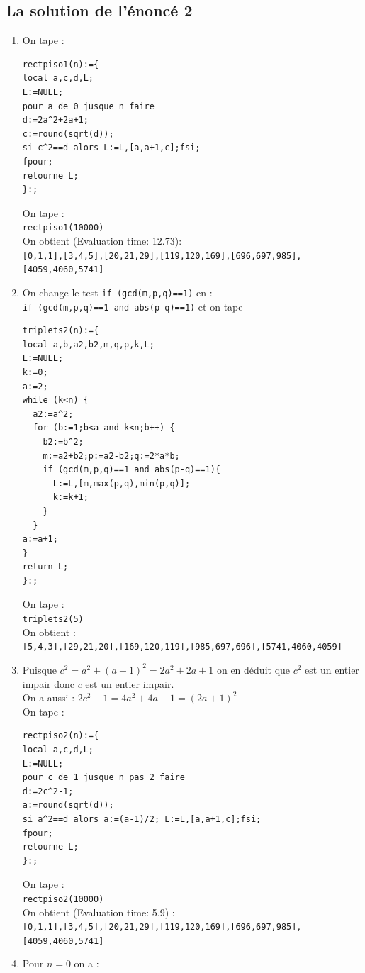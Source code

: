 \documentclass[a4paper,11pt]{book}
\begin{document}
\subsection{La solution de l'\'enonc\'e 2}
\begin{enumerate}
\item 
On tape :
\begin{verbatim}
rectpiso1(n):={
local a,c,d,L;
L:=NULL;
pour a de 0 jusque n faire 
d:=2a^2+2a+1;
c:=round(sqrt(d));
si c^2==d alors L:=L,[a,a+1,c];fsi;
fpour;
retourne L;
}:;
\end{verbatim}
On tape :\\
{\tt rectpiso1(10000)}\\
On obtient (Evaluation time: 12.73):\\
{\tt [0,1,1],[3,4,5],[20,21,29],[119,120,169],[696,697,985], [4059,4060,5741]}
\item On change le test {\tt if (gcd(m,p,q)==1)} en :\\
{\tt if (gcd(m,p,q)==1 and abs(p-q)==1)} et on tape
\begin{verbatim}
triplets2(n):={
local a,b,a2,b2,m,q,p,k,L;
L:=NULL;
k:=0;
a:=2;
while (k<n) {
  a2:=a^2;
  for (b:=1;b<a and k<n;b++) {
    b2:=b^2;
    m:=a2+b2;p:=a2-b2;q:=2*a*b;
    if (gcd(m,p,q)==1 and abs(p-q)==1){
      L:=L,[m,max(p,q),min(p,q)];
      k:=k+1;
    }
  } 
a:=a+1;
}
return L;
}:;
\end{verbatim} 
On tape :\\
{\tt triplets2(5)}\\
On obtient :\\
{\tt [5,4,3],[29,21,20],[169,120,119],[985,697,696],[5741,4060,4059]}
\item 
Puisque $c^2=a^2+(a+1)^2=2a^2+2a+1$ on en d\'eduit que $c^2$ est un entier 
impair donc $c$  est un entier impair.\\
On a aussi :
  $2c^2-1=4a^2+4a+1=(2a+1)^2$\\
On tape :
\begin{verbatim}
rectpiso2(n):={
local a,c,d,L;
L:=NULL;
pour c de 1 jusque n pas 2 faire 
d:=2c^2-1;
a:=round(sqrt(d));
si a^2==d alors a:=(a-1)/2; L:=L,[a,a+1,c];fsi;
fpour;
retourne L;
}:;
\end{verbatim}
On tape :\\
{\tt rectpiso2(10000)}\\
On obtient (Evaluation time: 5.9) :\\
{\tt [0,1,1],[3,4,5],[20,21,29],[119,120,169],[696,697,985], [4059,4060,5741]}
\item
Pour $n=0$ on a :\\

\end{enumerate}
\end{document}
